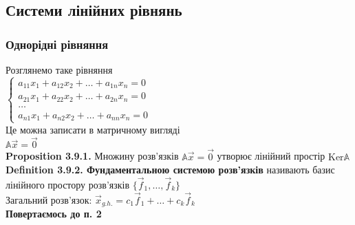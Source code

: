 \documentclass[a4paper, 14pt]{extarticle}
\def\defin#1{\textbf{Definition {#1}}}
\def\prp#1{\textbf{Proposition {#1}}}
\def\bigline{\vspace{5mm}\\}
\def\ker#1{\textrm{Ker} {#1}}
\begin{document}
\subsection{Системи лінійних рівнянь}
\subsubsection*{Однорідні рівняння}
Розглянемо таке рівняння\\
$\begin{cases}
a_{11}x_1 + a_{12}x_2 + \dots + a_{1n}x_n = 0\\
a_{21}x_1 + a_{22}x_2 + \dots + a_{2n}x_n = 0\\
\dots \\
a_{n1}x_1 + a_{n2}x_2 + \dots + a_{nn}x_n = 0
\end{cases}
$\\
Це можна записати в матричному вигляді\\
$\mathbb{A} \vec{x} = \vec{0}$\\
\prp{3.9.1.} Множину розв'язків $\mathbb{A} \vec{x} = \vec{0}$ утворює лінійний простір $\ker { \mathbb{A}}$
\bigline
\defin{3.9.2. Фундаментальною системою розв'язків} називають базис лінійного простору розв'язків $\{\vec{f}_1,\dots,\vec{f}_k\}$\\
Загальний розв'язок: $\vec{x}_{g.h.} = c_1 \vec{f}_1 + \dots + c_k \vec{f}_k$ 
\\
\textbf{Повертаємось до п. 2}
\newpage
{}
\setcounter{section}{2}
\setcounter{subsection}{10}
\end{document}
